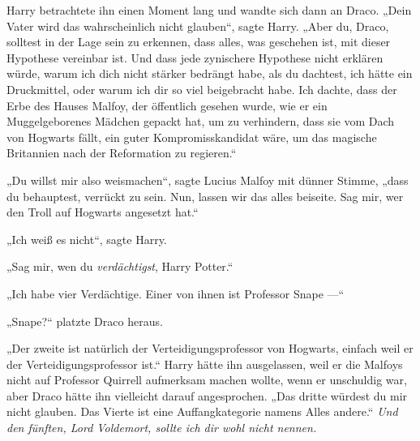 Harry betrachtete ihn einen Moment lang und wandte sich dann an Draco.
„Dein Vater wird das wahrscheinlich nicht glauben“, sagte Harry.
„Aber du, Draco, solltest in der Lage sein zu erkennen, dass alles, was geschehen ist, mit dieser Hypothese vereinbar ist. Und dass jede zynischere Hypothese nicht erklären würde, warum ich dich nicht stärker bedrängt habe, als du dachtest, ich hätte ein Druckmittel, oder warum ich dir so viel beigebracht habe. Ich dachte, dass der Erbe des Hauses Malfoy, der öffentlich gesehen wurde, wie er ein Muggelgeborenes Mädchen gepackt hat, um zu verhindern, dass sie vom Dach von Hogwarts fällt, ein guter Kompromisskandidat wäre, um das magische Britannien nach der Reformation zu regieren.“

„Du willst mir also weismachen“, sagte Lucius Malfoy mit dünner Stimme, „dass du behauptest, verrückt zu sein. Nun, lassen wir das alles beiseite. Sag mir, wer den Troll auf Hogwarts angesetzt hat.“

„Ich weiß es nicht“, sagte Harry.

„Sag mir, wen du \emph{verdächtigst}, Harry Potter.“

„Ich habe vier Verdächtige. Einer von ihnen ist Professor Snape —“

„Snape?“ platzte Draco heraus.

„Der zweite ist natürlich der Verteidigungsprofessor von Hogwarts, einfach weil er der Verteidigungsprofessor ist.“ Harry hätte ihn ausgelassen, weil er die Malfoys nicht auf Professor Quirrell aufmerksam machen wollte, wenn er unschuldig war, aber Draco hätte ihn vielleicht darauf angesprochen.
„Das dritte würdest du mir nicht glauben. Das Vierte ist eine Auffangkategorie namens Alles andere.“
\emph{Und den fünften, Lord Voldemort, sollte ich dir wohl nicht nennen.}

